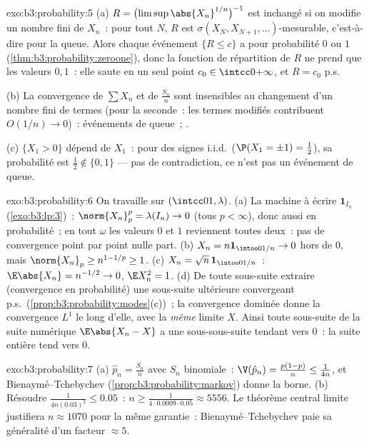 \begin{solution}{exo:b3:probability:5}
(a) $R = \bigl(\limsup\abs{X_n}^{1/n}\bigr)^{-1}$ est
inchangé si on modifie un nombre fini de $X_n$~: pour tout
$N$, $R$ est $\sigma(X_N, X_{N+1}, \dots)$-mesurable,
c'est-à-dire  pour la queue. Alors chaque
événement $\{R \leq c\}$ a pour probabilité $0$ ou $1$
(\cref{thm:b3:probability:zeroone}), donc la fonction de
répartition de $R$ ne prend que les valeurs $0, 1$~: elle
saute en un seul point $c_0 \in \intcc0{+\infty}$, et $R =
c_0$ p.s.

(b) La convergence de $\sum X_n$ et de $\frac{S_n}n$ sont
insensibles au changement d'un nombre fini de termes (pour
la seconde~: les termes modifiés contribuent $O(1/n) \to
0$)~: événements de queue~; .

(c) $\{X_1 > 0\}$ dépend de $X_1$~: pour des signes i.i.d.\
($\P(X_1 = \pm1) = \frac12$), sa probabilité est $\frac12
\notin \{0,1\}$ --- pas de contradiction, ce n'est pas un
événement de queue.
\end{solution}

\begin{solution}{exo:b3:probability:6}
On travaille sur $(\intcc01, \lambda)$.
(a) La machine à écrire $\mathbf 1_{I_n}$
(\cref{exo:b3:lp:3})~: $\norm{X_n}_p^p = \lambda(I_n) \to
0$ (tous $p < \infty$), donc aussi en probabilité~; en tout
$\omega$ les valeurs $0$ et $1$ reviennent toutes deux~:
pas de convergence point par point nulle part.
(b) $X_n = n\mathbf 1_{\intoo0{1/n}} \to 0$ hors de $0$,
mais $\norm{X_n}_p \geq n^{1 - 1/p} \geq 1$.
(c) $X_n = \sqrt n\,\mathbf 1_{\intoo0{1/n}}$~:
$\E\abs{X_n} = n^{-1/2} \to 0$, $\E X_n^2 = 1$.
(d) De toute sous-suite extraire (convergence en
probabilité) une sous-suite ultérieure convergeant p.s.\
(\cref{prop:b3:probability:modes}(c))~; la convergence
dominée donne la convergence $L^1$ le long d'elle, avec la
\emph{même} limite $X$. Ainsi toute sous-suite de la suite
numérique $\E\abs{X_n - X}$ a une sous-sous-suite tendant
vers $0$~: la suite entière tend vers $0$.
\end{solution}

\begin{solution}{exo:b3:probability:7}
(a) $\hat p_n = \frac{S_n}n$ avec $S_n$ binomiale~:
$\V(\hat p_n) = \frac{p(1-p)}n \leq \frac1{4n}$, et
Bienaymé--Tchebychev (\cref{prop:b3:probability:markov})
donne la borne.
(b) Résoudre $\frac1{4n(0.03)^2} \leq 0.05$~: $n \geq
\frac{1}{4\cdot0.0009\cdot0.05} \approx 5556$. Le théorème
central limite justifiera $n \approx 1070$ pour la même
garantie~: Bienaymé--Tchebychev paie sa généralité d'un
facteur $\approx 5$.
\end{solution}

